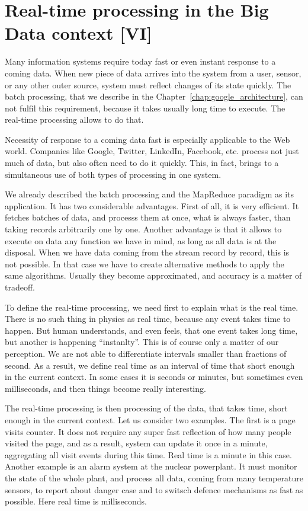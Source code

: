 \chapter{Real-time processing in the Big Data context [VI]}
\label{chap:real_time_processing}

Many information systems require today fast or even instant response to a coming data.
When new piece of data arrives into the system from a user, sensor, or any other outer source, system must reflect changes of its state quickly. 
The batch processing, that we describe in the Chapter~\ref{chap:google_architecture}, can not fulfil this requirement, because it takes usually long time to execute.
The real-time processing allows to do that.

Necessity of response to a coming data fast is especially applicable to the Web world.
Companies like Google, Twitter, LinkedIn, Facebook, etc. process not just much of data, but also often need to do it quickly.
This, in fact, brings to a simultaneous use of both types of processing in one system.

We already described the batch processing and the MapReduce paradigm as its application.
It has two considerable advantages.
First of all, it is very efficient.
It fetches batches of data, and processs them at once, what is always faster, than taking records arbitrarily one by one.
Another advantage is that it allows to execute on data any function we have in mind, as long as all data is at the disposal.
When we have data coming from the stream record by record, this is not possible.
In that case we have to create alternative methods to apply the same algorithms.
Usually they become approximated, and accuracy is a matter of tradeoff.

To define the real-time processing, we need first to explain what is the real time.
There is no such thing in physics as real time, because any event takes time to happen.
But human understands, and even feels, that one event takes long time, but another is happening ``instanlty''.
This is of course only a matter of our perception.
We are not able to differentiate intervals smaller than fractions of second.
As a result, we define real time as an interval of time that short enough in the current context.
In some cases it is seconds or minutes, but sometimes even milliseconds, and then things become really interesting.

The real-time processing is then processing of the data, that takes time, short enough in the current context.
Let us consider two examples.
The first is a page visits counter.
It does not require any super fast reflection of how many people visited the page, and as a result, system can update it once in a minute, aggregating all visit events during this time.
Real time is a minute in this case.
Another example is an alarm system at the nuclear powerplant.
It must monitor the state of the whole plant, and process all data, coming from many temperature sensors, to report about danger case and to switsch defence mechanisms as fast as possible.
Here real time is milliseconds.

